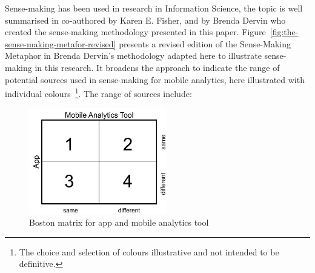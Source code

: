Sense-making has been used in research in Information Science, the topic is well summarised in \citealt{naumer2008_sense_making} co-authored by Karen E. Fisher, and by Brenda Dervin who created the sense-making methodology presented in this paper. Figure~\ref{fig:the-sense-making-metafor-revised} presents a revised edition of the Sense-Making Metaphor in Brenda Dervin's methodology adapted here to illustrate sense-making in this research. It broadens the approach to indicate the range of potential sources used in sense-making for mobile analytics, here illustrated with individual colours~\footnote{The choice and selection of colours illustrative and not intended to be definitive.}. The range of sources include:

\begin{figure}
    \centering
    \includegraphics[width=6cm]{images/my/Boston-matrix-app-and-mobile-analytics-tool.jpeg}
    \caption{Boston matrix for app and mobile analytics tool}
    \label{fig:boston-matrix-app-and-mobile-analytics-tool}
\end{figure}


